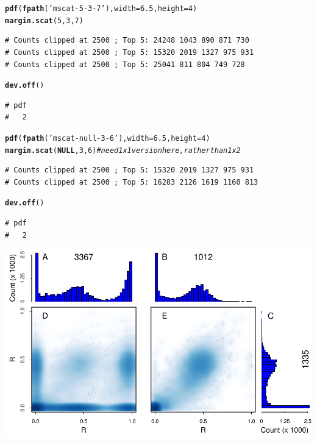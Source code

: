 \documentclass{article}\usepackage[]{graphicx}\usepackage[]{color}
\makeatletter
\newcommand{\hlnum}[1]{\textcolor[rgb]{0.686,0.059,0.569}{#1}}%
\newcommand{\hlstr}[1]{\textcolor[rgb]{0.192,0.494,0.8}{#1}}%
\newcommand{\hlcom}[1]{\textcolor[rgb]{0.678,0.584,0.686}{\textit{#1}}}%
\newcommand{\hlstd}[1]{\textcolor[rgb]{0.345,0.345,0.345}{#1}}%
\newcommand{\hlkwa}[1]{\textcolor[rgb]{0.161,0.373,0.58}{\textbf{#1}}}%
\newcommand{\hlkwc}[1]{\textcolor[rgb]{0.333,0.667,0.333}{#1}}%
\newcommand{\hlkwd}[1]{\textcolor[rgb]{0.737,0.353,0.396}{\textbf{#1}}}%
\newenvironment{kframe}{%
 \def\at@end@of@kframe{}%
 \ifinner\ifhmode%
  \def\at@end@of@kframe{\end{minipage}}%
  \begin{minipage}{\columnwidth}%
 \fi\fi%
 \def\FrameCommand##1{\hskip\@totalleftmargin \hskip-\fboxsep
 \colorbox{shadecolor}{##1}\hskip-\fboxsep
     \hskip-\linewidth \hskip-\@totalleftmargin \hskip\columnwidth}%
 \MakeFramed {\advance\hsize-\width
   \@totalleftmargin\z@ \linewidth\hsize
   \@setminipage}}%
 {\par\unskip\endMakeFramed%
 \at@end@of@kframe}
\newenvironment{knitrout}{}{} %
\makeatother
\begin{document}
\begin{knitrout}\footnotesize
{}\color{fgcolor}\begin{kframe}
\begin{alltt}
\hlkwd{pdf}\hlstd{(}\hlkwd{fpath}\hlstd{(}\hlstr{'mscat-5-3-7'}\hlstd{),} \hlkwc{width}\hlstd{=}\hlnum{6.5}\hlstd{,} \hlkwc{height}\hlstd{=}\hlnum{4}\hlstd{)}
\hlkwd{margin.scat}\hlstd{(}\hlnum{5}\hlstd{,}\hlnum{3}\hlstd{,}\hlnum{7}\hlstd{)}
\end{alltt}
\begin{verbatim}
# Counts clipped at 2500 ; Top 5: 24248 1043 890 871 730
# Counts clipped at 2500 ; Top 5: 15320 2019 1327 975 931
# Counts clipped at 2500 ; Top 5: 25041 811 804 749 728
\end{verbatim}
\begin{alltt}
\hlkwd{dev.off}\hlstd{()}
\end{alltt}
\begin{verbatim}
# pdf 
#   2
\end{verbatim}
\end{kframe}
\end{knitrout}
\begin{knitrout}\footnotesize
{}\color{fgcolor}\begin{kframe}
\begin{alltt}
\hlkwd{pdf}\hlstd{(}\hlkwd{fpath}\hlstd{(}\hlstr{'mscat-null-3-6'}\hlstd{),} \hlkwc{width}\hlstd{=}\hlnum{6.5}\hlstd{,} \hlkwc{height}\hlstd{=}\hlnum{4}\hlstd{)}
\hlkwd{margin.scat}\hlstd{(}\hlkwa{NULL}\hlstd{,}\hlnum{3}\hlstd{,}\hlnum{6}\hlstd{)} \hlcom{# need 1 x 1 version here, rather than 1 x 2}
\end{alltt}
\begin{verbatim}
# Counts clipped at 2500 ; Top 5: 15320 2019 1327 975 931
# Counts clipped at 2500 ; Top 5: 16283 2126 1619 1160 813
\end{verbatim}
\begin{alltt}
\hlkwd{dev.off}\hlstd{()}
\end{alltt}
\begin{verbatim}
# pdf 
#   2
\end{verbatim}
\end{kframe}
\end{knitrout}

\noindent\includegraphics{Fig1-mscat-figs/mscat-6-2-7.pdf}
\end{document}
